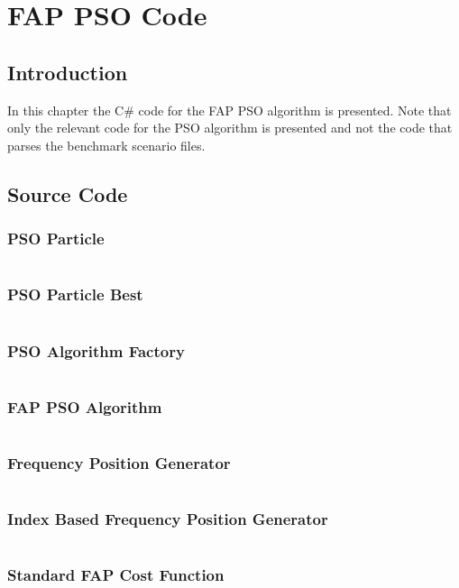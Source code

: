 \appendix
\label{chpt:apxFAPPSO}
\chapter{FAP PSO Code}
\section{Introduction}
In this chapter the C\# code for the FAP PSO algorithm is presented. Note that only the relevant code for the PSO algorithm is presented and not the code that parses the benchmark scenario files.
\section{Source Code}
\subsection{PSO Particle}
\inputminted[fontsize=\tiny]{csharp}{../Implementation/PSOFAP/PSOFAPConsole/PSO/Particle.cs}
\subsection{PSO Particle Best}
\inputminted[fontsize=\tiny]{csharp}{../Implementation/PSOFAP/PSOFAPConsole/PSO/ParticleBest.cs}
\subsection{PSO Algorithm Factory}
\inputminted[fontsize=\tiny]{csharp}{../Implementation/PSOFAP/PSOFAPConsole/FAPPSO/FAPPSOFactory.cs}
\subsection{FAP PSO Algorithm}
\inputminted[fontsize=\tiny]{csharp}{../Implementation/PSOFAP/PSOFAPConsole/FAPPSO/FAPPSOAlgorithmDissertation.cs}
\subsection{Frequency Position Generator}
\inputminted[fontsize=\tiny]{csharp}{../Implementation/PSOFAP/PSOFAPConsole/FAPPSO/FrequencyPositionGenerator.cs}
\subsection{Index Based Frequency Position Generator}
\inputminted[fontsize=\tiny]{csharp}{../Implementation/PSOFAP/PSOFAPConsole/FAPPSO/FrequencyIndexPositionGenerator.cs}
\subsection{Standard FAP Cost Function}
\inputminted[fontsize=\tiny]{csharp}{../Implementation/PSOFAP/PSOFAPConsole/FAPPSO/FAPCostFunction.cs}
